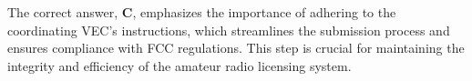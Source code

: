 The correct answer, \textbf{C}, emphasizes the importance of adhering to the coordinating VEC’s instructions, which streamlines the submission process and ensures compliance with FCC regulations. This step is crucial for maintaining the integrity and efficiency of the amateur radio licensing system.

